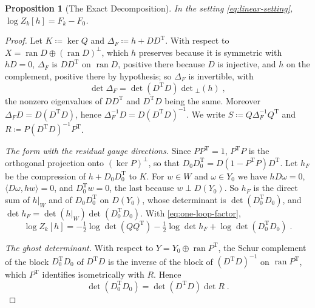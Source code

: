 \documentclass[11pt]{preprint}
\numberwithin{equation}{section}
\newtheorem{proposition}{Proposition}
\theoremstyle{definition}
\theoremstyle{remark}
\theoremstyle{plain}
\begin{document}
\begin{proposition}[The Exact Decomposition]\label{prop:exact-decomposition}
In the setting \eqref{eq:linear-setting}, $\log Z_k[h] = F_k - F_0$.
\end{proposition}

\begin{proof}
Let $K \coloneqq \ker Q$ and $\Delta_F \coloneqq h + DD^{\mathrm T}$. With respect to $X = \operatorname{ran}D \oplus (\operatorname{ran}D)^\perp$, which $h$ preserves because it is symmetric with $hD = 0$, $\Delta_F$ is $DD^{\mathrm T}$ on $\operatorname{ran}D$, positive there because $D$ is injective, and $h$ on the complement, positive there by hypothesis; so $\Delta_F$ is invertible, with
\begin{equation}\label{eq:feynman-determinant}
    \det\Delta_F = \det(D^{\mathrm T}D)\det{}_\perp(h)\;,
\end{equation}
the nonzero eigenvalues of $DD^{\mathrm T}$ and $D^{\mathrm T}D$ being the same. Moreover $\Delta_FD = D(D^{\mathrm T}D)$, hence $\Delta_F^{-1}D = D(D^{\mathrm T}D)^{-1}$. We write $S \coloneqq Q\Delta_F^{-1}Q^{\mathrm T}$ and $R \coloneqq P(D^{\mathrm T}D)^{-1}P^{\mathrm T}$.

\emph{The form with the residual gauge directions.} Since $PP^{\mathrm T} = 1$, $P^{\mathrm T}P$ is the orthogonal projection onto $(\ker P)^\perp$, so that $D_0D_0^{\mathrm T} = D(1 - P^{\mathrm T}P)D^{\mathrm T}$. Let $h_F$ be the compression of $h + D_0D_0^{\mathrm T}$ to $K$. For $w \in W$ and $\omega \in Y_0$ we have $hD\omega = 0$, $\langle D\omega, hw \rangle = 0$, and $D_0^{\mathrm T}w = 0$, the last because $w \perp D(Y_0)$. So $h_F$ is the direct sum of $h|_W$ and of $D_0D_0^{\mathrm T}$ on $D(Y_0)$, whose determinant is $\det(D_0^{\mathrm T}D_0)$, and $\det h_F = \det(h|_W)\det(D_0^{\mathrm T}D_0)$. With \eqref{eq:one-loop-factor},
\begin{equation}\label{eq:one-loop-feynman}
    \log Z_k[h] = -\tfrac12\log\det(QQ^{\mathrm T}) - \tfrac12\log\det h_F + \log\det(D_0^{\mathrm T}D_0)\;.
\end{equation}

\emph{The ghost determinant.} With respect to $Y = Y_0 \oplus \operatorname{ran}P^{\mathrm T}$, the Schur complement of the block $D_0^{\mathrm T}D_0$ of $D^{\mathrm T}D$ is the inverse of the block of $(D^{\mathrm T}D)^{-1}$ on $\operatorname{ran}P^{\mathrm T}$, which $P^{\mathrm T}$ identifies isometrically with $R$. Hence
\begin{equation}\label{eq:ghost-schur}
    \det(D_0^{\mathrm T}D_0) = \det(D^{\mathrm T}D)\det R\;.
\end{equation}


\end{proof}
\end{document}
